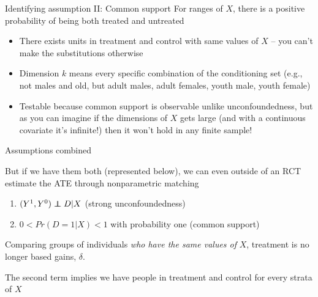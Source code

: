 \documentclass{beamer}
\newcommand\independent{\protect\mathpalette{\protect\independenT}{\perp}}
\def\independenT#1#2{\mathrel{\rlap{$#1#2$}\mkern2mu{#1#2}}}
\begin{document}
\begin{frame}[plain]

	\begin{block}{Identifying assumption II: Common support}
	For ranges of $X$, there is a positive probability of being both treated and untreated
	\end{block}
	
	\begin{itemize}
	\item There exists units in treatment and control with same values of $X$ -- you can't make the substitutions otherwise
	\item Dimension $k$ means every specific combination of the conditioning set (e.g., not males and old, but adult males, adult females, youth male, youth female)
	\item Testable because common support is observable unlike unconfoundedness, but as you can imagine if the dimensions of $X$ gets large (and with a continuous covariate it's infinite!) then it won't hold in any finite sample!
	\end{itemize}
	
	
\end{frame}



\begin{frame}{Assumptions combined}
	
But if we have them both (represented below), we can even outside of an RCT estimate the ATE through nonparametric matching
  \begin{enumerate}
		\item $(Y^1,Y^0) \independent{D} | X$ (strong unconfoundedness)
		\item $0<Pr(D=1|X)<1$ with probability one (common support)
  \end{enumerate}

\bigskip
Comparing groups of individuals \emph{who have the same values of} $X$, treatment is no longer based gains, $\delta$. 

\bigskip

The second term implies we have people in treatment and control for every strata of $X$
\end{frame}
\end{document}
